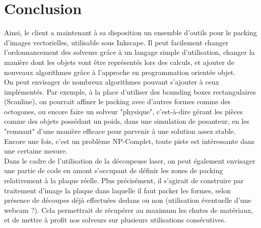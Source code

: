 \documentclass{style}
\begin{document}
\newpage
\section*{Conclusion}

Ainsi, le client a maintenant à sa disposition un ensemble d'outils pour le packing d'images vectorielles, utilisable sous Inkscape. Il peut facilement changer l'ordonnancement des solveurs grâce à un langage simple d'utilisation, changer la manière dont les objets vont être représentés lors des calculs, et ajouter de nouveaux algorithmes grâce à l'approche en programmation orientée objet.\\


On peut envisager de nombreux algorithmes pouvant s'ajouter à ceux implémentés. Par exemple, à la place d'utiliser des bounding boxes rectangulaires (Scanline), on pourrait affiner le packing avec d'autres formes comme des octogones, ou encore faire un solveur "physique", c'est-à-dire gérant les pièces comme des objets possédant un poids, dans une simulation de pesanteur, en les "remuant" d'une manière efficace pour parvenir à une solution assez stable. Encore une fois, c'est un problème NP-Complet, toute piste est intéressante dans une certaine mesure.\\

Dans le cadre de l'utilisation de la découpeuse laser, on peut également envisager une partie de code en amont s'occupant de définir les zones de packing relativement à la plaque réelle. Plus précisément, il s'agirait de construire par traitement d'image la plaque dans laquelle il faut packer les formes, selon présence de découpes déjà effectuées dedans ou non (utilisation éventuelle d'une webcam ?). Cela permettrait de récupérer au maximum les chutes de matériaux, et de mettre à profit nos solveurs sur plusieurs utilisations consécutives.\\


\newpage
\newpage

%

\newpage

\end{document}
